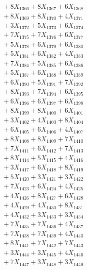 \documentclass[a4paper,10pt]{article}
\begin{document}
{\begin{align}
&\;  + 8 X_{1366} + 8 X_{1367} + 6 X_{1368} \\[0.3ex]
&\;  + 8 X_{1369} + 8 X_{1370} + 4 X_{1371} \\[0.3ex]
&\;  + 3 X_{1372} + 5 X_{1373} + 6 X_{1374} \\[0.3ex]
&\;  + 7 X_{1375} + 7 X_{1376} + 6 X_{1377} \\[0.3ex]
&\;  + 5 X_{1378} + 6 X_{1379} + 6 X_{1380} \\[0.3ex]
&\;  + 5 X_{1381} + 6 X_{1382} + 4 X_{1383} \\[0.3ex]
&\;  + 7 X_{1384} + 5 X_{1385} + 6 X_{1386} \\[0.3ex]
&\;  + 5 X_{1387} + 6 X_{1388} + 6 X_{1389} \\[0.5ex]\allowbreak
&\;  + 6 X_{1390} + 5 X_{1391} + 7 X_{1392} \\[0.3ex]
&\;  + 8 X_{1393} + 7 X_{1394} + 6 X_{1395} \\[0.3ex]
&\;  + 6 X_{1396} + 6 X_{1397} + 6 X_{1398} \\[0.3ex]
&\;  + 8 X_{1399} + 8 X_{1400} + 6 X_{1401} \\[0.3ex]
&\;  + 3 X_{1402} + 4 X_{1403} + 8 X_{1404} \\[0.3ex]
&\;  + 6 X_{1405} + 6 X_{1406} + 4 X_{1407} \\[0.3ex]
&\;  + 8 X_{1408} + 8 X_{1409} + 7 X_{1410} \\[0.3ex]
&\;  + 7 X_{1411} + 6 X_{1412} + 7 X_{1413} \\[0.3ex]
&\;  + 8 X_{1414} + 5 X_{1415} + 4 X_{1416} \\[0.3ex]
&\;  + 3 X_{1417} + 6 X_{1418} + 8 X_{1419} \\[0.5ex]\allowbreak
&\;  + 5 X_{1420} + 3 X_{1421} + 3 X_{1422} \\[0.3ex]
&\;  + 7 X_{1423} + 6 X_{1424} + 4 X_{1425} \\[0.3ex]
&\;  + 4 X_{1426} + 8 X_{1427} + 6 X_{1428} \\[0.3ex]
&\;  + 4 X_{1429} + 4 X_{1430} + 8 X_{1431} \\[0.3ex]
&\;  + 4 X_{1432} + 3 X_{1433} + 3 X_{1434} \\[0.3ex]
&\;  + 7 X_{1435} + 7 X_{1436} + 4 X_{1437} \\[0.3ex]
&\;  + 7 X_{1438} + 7 X_{1439} + 4 X_{1440} \\[0.3ex]
&\;  + 8 X_{1441} + 7 X_{1442} + 7 X_{1443} \\[0.3ex]
&\;  + 3 X_{1444} + 3 X_{1445} + 4 X_{1446} \\[0.3ex]
&\;  + 7 X_{1447} + 3 X_{1448} + 3 X_{1449} \\[0.5ex]\allowbreak

\end{align}}
\end{document}
